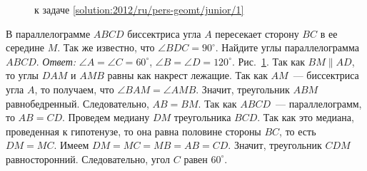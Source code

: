 \ifsolution
\begin{figure}\centering
    \caption{к задаче \ref{solution:2012/ru/pers-geomt/junior/1}}
    \label{fig:solution:2012/ru/pers-geomt/junior/1}
\end{figure}
\fi %

\problem
В параллелограмме $ABCD$ биссектриса угла $A$ пересекает сторону $BC$ в ее
середине $M$.
Так же известно, что $\angle BDC = 90^\circ$.
Найдите углы параллелограмма $ABCD$.
\solution
\label{solution:2012/ru/pers-geomt/junior/1}%
\emph{Ответ:}
$\angle A = \angle C = 60^\circ$,
$\angle B = \angle D = 120^\circ$.
Рис.~\ref{fig:solution:2012/ru/pers-geomt/junior/1}.
Так как $BM \parallel AD$, то углы $DAM$ и $AMB$ равны как накрест лежащие.
Так как $AM$~--- биссектриса угла $A$, то получаем, что
$\angle BAM = \angle AMB$.
Значит, треугольник $ABM$ равнобедренный.
Следовательно, $AB = BM$.
Так как $ABCD$~--- параллелограмм, то $AB = CD$.
Проведем медиану $DM$ треугольника $BCD$.
Так как это медиана, проведенная к гипотенузе, то она равна половине стороны
$BC$, то есть $DM = MC$.
Имеем $DM = MC = MB = AB = CD$.
Значит, треугольник $CDM$ равносторонний.
Следовательно, угол $C$ равен $60^\circ$.
\endproblem
